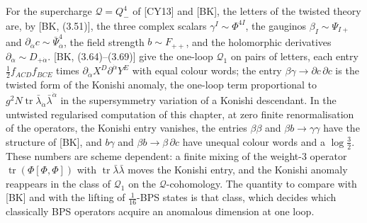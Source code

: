 \begin{remark}
For the supercharge $\mathcal Q=Q^4_-$ of [CY13] and [BK], the letters of the twisted theory are, by [BK, (3.51)], the three complex scalars $\gamma^I\sim\Phi^{4I}$, the gauginos $\beta_I\sim\Psi_{I+}$ and $\partial_{\dot\alpha}c\sim\bar\Psi^4_{\dot\alpha}$, the field strength $b\sim F_{++}$, and the holomorphic derivatives $\partial_{\dot\alpha}\sim D_{+\dot\alpha}$. [BK, (3.64)--(3.69)] give the one-loop $\mathcal Q_1$ on pairs of letters, each entry $\tfrac12f_{ACD}f_{BCE}$ times $\partial_{\dot\alpha}X^D\partial^{\dot\alpha}Y^E$ with equal colour words; the entry $\beta\gamma\to\partial c\,\partial c$ is the twisted form of the Konishi anomaly, the one-loop term proportional to $g^2N\operatorname{tr}\bar\lambda_{\dot\alpha}\bar\lambda^{\dot\alpha}$ in the supersymmetry variation of a Konishi descendant. In the untwisted regularised computation of this chapter, at zero finite renormalisation of the operators, the Konishi entry vanishes, the entries $\beta\beta$ and $\beta b\to\gamma\gamma$ have the structure of [BK], and $b\gamma$ and $\beta b\to\beta\,\partial c$ have unequal colour words and a $\log\tfrac32$. These numbers are scheme dependent: a finite mixing of the weight-$3$ operator $\operatorname{tr}(\Phi[\Phi,\Phi])$ with $\operatorname{tr}\bar\lambda\bar\lambda$ moves the Konishi entry, and the Konishi anomaly reappears in the class of $\mathcal Q_1$ on the $\mathcal Q$-cohomology. The quantity to compare with [BK] and with the lifting of $\tfrac1{16}$-BPS states is that class, which decides which classically BPS operators acquire an anomalous dimension at one loop.
\end{remark}
